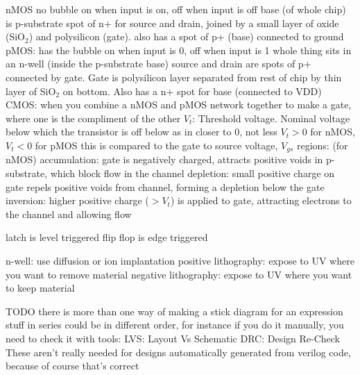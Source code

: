 \documentclass[12pt]{article}
\begin{document}
\begin{spacing}{0.8}
\begin{multicols*}{2}
\begin{flushleft}
\begin{outline}[longenum]
  \1 nMOS
    \2 no bubble
    \2 on when input is on, off when input is off
    \2 base (of whole chip) is p-substrate
    \2 spot of n+ for source and drain, joined by a small layer of oxide (SiO$_2$) and polysilicon (gate). also has a spot of p+ (base) connected to ground
  \1 pMOS:
    \2 has the bubble
    \2 on when input is 0, off when input is 1
    \2 whole thing sits in an n-well (inside the p-substrate base)
    \2 source and drain are spots of p+ connected by gate.
      Gate is polysilicon layer separated from rest of chip by thin layer of SiO$_2$ on bottom.
      Also has a n+ spot for base (connected to VDD)
  \1 CMOS: when you combine a nMOS and pMOS network together to make a gate, where one is the compliment of the other
  \1 $V_t$: Threshold voltage. Nominal voltage below which the transistor is off
    \2 below as in closer to 0, not less
    \2 $V_t>0$ for nMOS, $V_t<0$ for pMOS
    \2 this is compared to the gate to source voltage, $V_{gs}$
  \1 regions: (for nMOS)
    \2 accumulation: gate is negatively charged, attracts positive voids in p-substrate, which block flow in the channel
    \2 depletion: small positive charge on gate repels positive voids from channel, forming a depletion below the gate
    \2 inversion: higher positive charge ($>V_t$) is applied to gate, attracting electrons to the channel and allowing flow

  \1 latch is level triggered
  \1 flip flop is edge triggered

  \1 n-well: use diffusion or ion implantation
  \1 positive lithography: expose to UV where you want to remove material
  \1 negative lithography: expose to UV where you want to keep material



  \1 TODO
  \1 there is more than one way of making a stick diagram for an expression
    \2 stuff in series could be in different order, for instance
  \1 if you do it manually, you need to check it with tools:
    \2 LVS: Layout Vs Schematic
    \2 DRC: Design Re-Check
    \2 These aren't really needed for designs automatically generated from verilog code, because of course that's correct


\end{outline}
\end{flushleft}
\end{multicols*}
\end{spacing}
\end{document}

